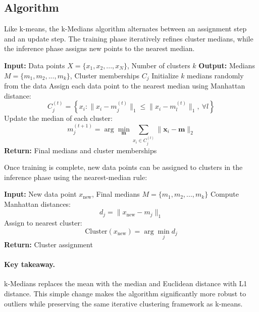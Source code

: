 \documentclass{article}
\begin{document}
\subsection{Algorithm}

Like k-means, the k-Medians algorithm alternates between an assignment step and
an update step. The training phase iteratively refines cluster medians, while the
inference phase assigns new points to the nearest median.

\begin{algorithm}[H]
\caption{k-Medians Clustering Algorithm (Training Phase)}
\begin{algorithmic}[1]
\State \textbf{Input:} Data points $X = \{x_1, x_2, ..., x_N\}$, Number of clusters $k$
\State \textbf{Output:} Medians $M = \{m_1, m_2, ..., m_k\}$, Cluster memberships $C_j$
\State Initialize $k$ medians randomly from the data
\Repeat
    \State Assign each data point to the nearest median using Manhattan distance:
    \[
    C_j^{(t)} = \left\{ x_i : \|x_i - m_j^{(t)}\|_1 \leq \|x_i - m_l^{(t)}\|_1,\ \forall l \right\}
    \]
    \State Update the median of each cluster:
    \[
    m_j^{(t+1)} = \arg \min_{\mathbf{m}} \sum_{x_i \in C_j^{(t)}} \|\mathbf{x}_i - \mathbf{m}\|_2
    \]
\State \textbf{Return:} Final medians and cluster memberships
\end{algorithmic}
\end{algorithm}

Once training is complete, new data points can be assigned to clusters in the
inference phase using the nearest-median rule:

\begin{algorithm}[H]
\caption{k-Medians Clustering Algorithm (Inference Phase)}
\begin{algorithmic}[1]
\State \textbf{Input:} New data point $x_{\text{new}}$, Final medians $M = \{m_1, m_2, ..., m_k\}$
\State Compute Manhattan distances:
\[
d_j = \|x_{\text{new}} - m_j\|_1
\]
\State Assign to nearest cluster:
\[
\text{Cluster}(x_{\text{new}}) = \arg \min_j d_j
\]
\State \textbf{Return:} Cluster assignment
\end{algorithmic}
\end{algorithm}

\paragraph{Key takeaway.}
k-Medians replaces the mean with the median and Euclidean distance with L1
distance. This simple change makes the algorithm significantly more robust to
outliers while preserving the same iterative clustering framework as k-means.
\end{document}

